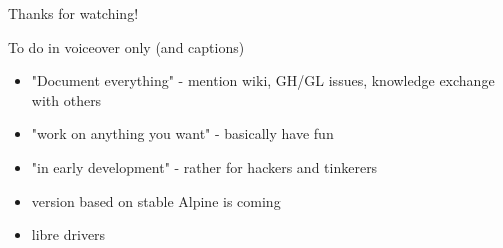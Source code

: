 \documentclass[aspectratio=169]{beamer}
\begin{document}
\begin{frame}{}%
	\center \Large Thanks for watching!
\end{frame}

\begin{frame}{To do in voiceover only (and captions)}
\begin{itemize}
\item "Document everything" -  mention wiki, GH/GL issues, knowledge exchange with others
	\item "work on anything you want" - basically have fun
	\item "in early development" - rather for hackers and tinkerers
	\item version based on stable Alpine is coming
	\item libre drivers
\end{itemize}
\end{frame}
\end{document}

